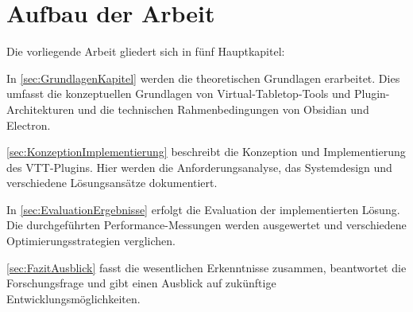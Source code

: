 \section{Aufbau der Arbeit}
\label{sec:AufbauArbeit}

Die vorliegende Arbeit gliedert sich in fünf Hauptkapitel:

In \autoref{sec:GrundlagenKapitel} werden die theoretischen Grundlagen erarbeitet. Dies umfasst die konzeptuellen Grundlagen von Virtual-Tabletop-Tools und Plugin-Architekturen und die technischen Rahmenbedingungen von Obsidian und Electron.

\autoref{sec:KonzeptionImplementierung} beschreibt die Konzeption und Implementierung des \ac{VTT}-Plugins. Hier werden die Anforderungsanalyse, das Systemdesign und verschiedene Lösungsansätze dokumentiert.

In \autoref{sec:EvaluationErgebnisse} erfolgt die Evaluation der implementierten Lösung. Die durchgeführten Performance-Messungen werden ausgewertet und verschiedene Optimierungsstrategien verglichen.

\autoref{sec:FazitAusblick} fasst die wesentlichen Erkenntnisse zusammen, beantwortet die Forschungsfrage und gibt einen Ausblick auf zukünftige Entwicklungsmöglichkeiten.
